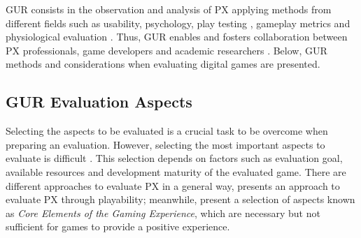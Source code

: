 \ac{GUR} consists in the observation and analysis of \ac{PX} applying methods from different fields such as usability, psychology, play testing \autocite{Wiemeyer2016}, gameplay metrics \autocite{Drachen2013} and physiological evaluation \autocite{Nacke2015}. Thus, \ac{GUR} enables and fosters collaboration between \ac{PX} professionals, game developers and academic researchers \autocite{desurvire_methods_2013}. Below, \ac{GUR} methods and considerations when evaluating digital games are presented.


\subsection{\ac{GUR} Evaluation Aspects}
\label{subsec:aspects}

Selecting the aspects to be evaluated is a crucial task to be overcome when preparing an evaluation. However, selecting the most important aspects to evaluate is difficult \autocite{Nacked}. This selection depends on factors such as evaluation goal, available resources and development maturity of the evaluated game. There are different approaches to evaluate \ac{PX} in a general way, \textcite{Sanchez2009} presents an approach to evaluate \ac{PX} through playability; meanwhile, \textcite{Calvillo-Gamez2015} present a selection of aspects known as \emph{Core Elements of the Gaming Experience}, which are necessary but not sufficient for games to provide a positive experience.

